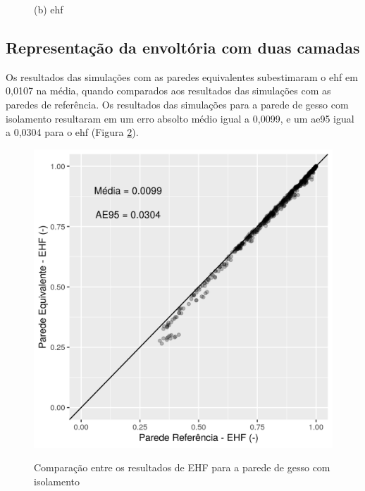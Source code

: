\documentclass[brazil,hardcopy,openany]{ufscthesis} %
\newcommand{\figsize}{.6}
\begin{document}
\begin{figure}[h]
\begin{minipage}{.5\textwidth}
		\begin{center}
			\small{(b) \acrlong{ehf}}
		\end{center}
	\end{minipage}
	\label{fig:cpaverage_tempEHF_scatter}
\end{figure}

%

\subsection{Representação da envoltória com duas camadas}

Os resultados das simulações com as paredes equivalentes subestimaram o \acrshort{ehf} em 0,0107 na média, quando comparados aos resultados das simulações com as paredes de referência. 
Os resultados das simulações para a parede de gesso com isolamento resultaram em um erro absolto médio igual a 0,0099, e um \acrshort{ae95} igual a 0,0304 para o \acrshort{ehf} (Figura \ref{fig:par3_scatter}).

\begin{figure}[h]
	\centering
	\caption{Comparação entre os resultados de EHF para a parede de gesso com isolamento}
	\includegraphics[width=.5\linewidth]{img/paredeeq_EHF_par3_scatter.png}
	\label{fig:par3_scatter}
\end{figure}
\end{document}
